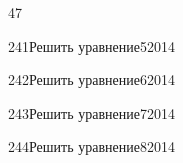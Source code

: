 \begin{TrigSourcePage}{47}
\begin{TrigExercise}{241}{Решить уравнение}{5}{2014}
\end{TrigExercise}
\begin{TrigExercise}{242}{Решить уравнение}{6}{2014}
\end{TrigExercise}
\begin{TrigExercise}{243}{Решить уравнение}{7}{2014}
\end{TrigExercise}
\begin{TrigExercise}{244}{Решить уравнение}{8}{2014}
\end{TrigExercise}
\end{TrigSourcePage}
